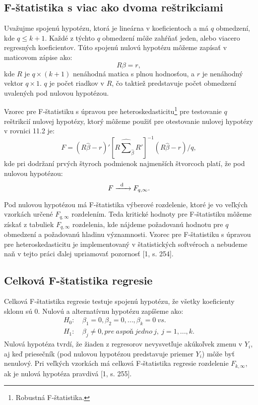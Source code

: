 \documentclass[]{tukediphc}
\begin{document}
\subsection{F-štatistika s viac ako dvoma reštrikciami}

Uvažujme spojenú hypotézu, ktorá je lineárna v koeficientoch a má $q$ obmedzení, kde $q \leq k + 1$. Každé z týchto $q$ obmedzení môže zahŕňať jeden, alebo viacero regresných koeficientov. Túto spojenú nulovú hypotézu môžeme zapísať v maticovom zápise ako:
\begin{equation}
    R\beta = r,
\end{equation}
kde $R$ je $q \times (k + 1)$ nenáhodná matica s plnou hodnosťou, a $r$ je nenáhodný vektor $q \times 1$. $q$ je počet riadkov v $R$, čo taktiež predstavuje počet obmedzení uvalených pod nulovou hypotézou. 

Vzorec pre F-štatistiku s úpravou pre heteroskedasticitu\footnote{Robustná F-štatistika.} pre testovanie $q$ reštrikcií nulovej hypotézy, ktorý môžeme použiť pre otestovanie nulovej hypotézy v rovnici 11.2 je:
\begin{equation}
    F = (R\hat{\beta}-r)'[R\hat{\sum}_{\hat{\beta}}R']^{-1}(R\hat{\beta}-r)/q,
\end{equation}
kde pri dodržaní prvých štyroch podmienok najmenších štvorcoch platí, že pod nulovou hypotézou:
\begin{equation}
    F \xrightarrow[\text{}]{\text{\; d \; }} F_{q, \infty}.
\end{equation}
Pod nulovou hypotézou má F-štatistika výberové rozdelenie, ktoré je vo veľkých vzorkách určené $F_{q, \infty}$ rozdelením. Teda kritické hodnoty pre F-štatistiku môžeme získať z tabuliek $F_{q, \infty}$ rozdelenia, kde nájdeme požadovanú hodnotu pre $q$ obmedzení a požadovanú hladinu významnosti.
Vzorec pre F-štatistiku s úpravou pre heteroskedasticitu je implementovaný v štatistických softvéroch a nebudeme naň v tejto práci ďalej upriamovať pozornosť [1, s. 254]. 

\subsection{Celková F-štatistika regresie}

Celková F-štatistika regresie testuje spojenú hypotézu, že všetky koeficienty sklonu sú 0. Nulovú a alternatívnu hypotézu zapíšeme ako:
\begin{equation}
\begin{split}
    H_{0}: & \ \beta_{1} = 0, \beta_{2} = 0, ..., \beta_{k} = 0 \ vs. \\
    H_{1}: & \ \beta_{j} \neq 0, pre \ aspoň \ jedno \ j,\ j=1, ..., k.
\end{split}
\end{equation}
Nulová hypotéza tvrdí, že žiaden z regresorov nevysvetľuje akúkoľvek zmenu v $Y_i$, aj keď priesečník (pod nulovou hypotézou predstavuje priemer $Y_i$) môže byť nenulový. Pri veľkých vzorkách má celková F-štatistika regresie rozdelenie $F_{k,\infty}$, ak je nulová hypotéza pravdivá [1, s. 255].
\end{document}

